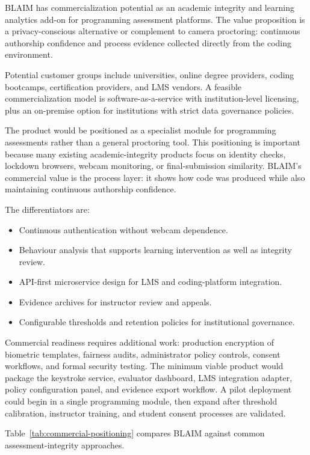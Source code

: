 BLAIM has commercialization potential as an academic integrity and learning analytics add-on for programming assessment platforms. The value proposition is a privacy-conscious alternative or complement to camera proctoring: continuous authorship confidence and process evidence collected directly from the coding environment.

Potential customer groups include universities, online degree providers, coding bootcamps, certification providers, and LMS vendors. A feasible commercialization model is software-as-a-service with institution-level licensing, plus an on-premise option for institutions with strict data governance policies.

The product would be positioned as a specialist module for programming assessments rather than a general proctoring tool. This positioning is important because many existing academic-integrity products focus on identity checks, lockdown browsers, webcam monitoring, or final-submission similarity. BLAIM's commercial value is the process layer: it shows how code was produced while also maintaining continuous authorship confidence.

The differentiators are:

\begin{itemize}
  \item Continuous authentication without webcam dependence.
  \item Behaviour analysis that supports learning intervention as well as integrity review.
  \item API-first microservice design for LMS and coding-platform integration.
  \item Evidence archives for instructor review and appeals.
  \item Configurable thresholds and retention policies for institutional governance.
\end{itemize}

Commercial readiness requires additional work: production encryption of biometric templates, fairness audits, administrator policy controls, consent workflows, and formal security testing. The minimum viable product would package the keystroke service, evaluator dashboard, LMS integration adapter, policy configuration panel, and evidence export workflow. A pilot deployment could begin in a single programming module, then expand after threshold calibration, instructor training, and student consent processes are validated.

Table~\ref{tab:commercial-positioning} compares BLAIM against common assessment-integrity approaches.

